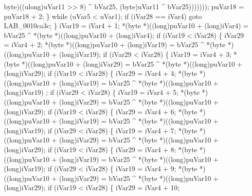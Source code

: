 \documentclass[
]{article}
\newenvironment{Shaded}{}{}
\newcommand{\NormalTok}[1]{#1}
\begin{document}
\begin{Shaded}
\begin{Highlighting}[]
\NormalTok{                                                  byte)((ulong)uVar11 \textgreater{}\textgreater{} 8) \^{} bVar25,}
\NormalTok{                                                  (byte)uVar11 \^{} bVar25)))))));}
\NormalTok{        puVar18 = puVar18 + 2;}
\NormalTok{      \} while (uVar5 \textless{} uVar1);}
\NormalTok{      if (iVar28 == iVar4) goto LAB\_0010ca3c;}
\NormalTok{    \}}
\NormalTok{    iVar19 = iVar4 + 1;}
\NormalTok{    *(byte *)((long)puVar10 + (long)iVar4) = bVar25 \^{} *(byte *)((long)puVar10 + (long)iVar4);}
\NormalTok{    if (iVar19 \textless{} iVar28) \{}
\NormalTok{      iVar29 = iVar4 + 2;}
\NormalTok{      *(byte *)((long)puVar10 + (long)iVar19) = bVar25 \^{} *(byte *)((long)puVar10 + (long)iVar19);}
\NormalTok{      if (iVar29 \textless{} iVar28) \{}
\NormalTok{        iVar19 = iVar4 + 3;}
\NormalTok{        *(byte *)((long)puVar10 + (long)iVar29) = bVar25 \^{} *(byte *)((long)puVar10 + (long)iVar29);}
\NormalTok{        if (iVar19 \textless{} iVar28) \{}
\NormalTok{          iVar29 = iVar4 + 4;}
\NormalTok{          *(byte *)((long)puVar10 + (long)iVar19) = bVar25 \^{} *(byte *)((long)puVar10 + (long)iVar19)}
\NormalTok{          ;}
\NormalTok{          if (iVar29 \textless{} iVar28) \{}
\NormalTok{            iVar19 = iVar4 + 5;}
\NormalTok{            *(byte *)((long)puVar10 + (long)iVar29) =}
\NormalTok{                 bVar25 \^{} *(byte *)((long)puVar10 + (long)iVar29);}
\NormalTok{            if (iVar19 \textless{} iVar28) \{}
\NormalTok{              iVar29 = iVar4 + 6;}
\NormalTok{              *(byte *)((long)puVar10 + (long)iVar19) =}
\NormalTok{                   bVar25 \^{} *(byte *)((long)puVar10 + (long)iVar19);}
\NormalTok{              if (iVar29 \textless{} iVar28) \{}
\NormalTok{                iVar19 = iVar4 + 7;}
\NormalTok{                *(byte *)((long)puVar10 + (long)iVar29) =}
\NormalTok{                     bVar25 \^{} *(byte *)((long)puVar10 + (long)iVar29);}
\NormalTok{                if (iVar19 \textless{} iVar28) \{}
\NormalTok{                  iVar29 = iVar4 + 8;}
\NormalTok{                  *(byte *)((long)puVar10 + (long)iVar19) =}
\NormalTok{                       bVar25 \^{} *(byte *)((long)puVar10 + (long)iVar19);}
\NormalTok{                  if (iVar29 \textless{} iVar28) \{}
\NormalTok{                    iVar19 = iVar4 + 9;}
\NormalTok{                    *(byte *)((long)puVar10 + (long)iVar29) =}
\NormalTok{                         bVar25 \^{} *(byte *)((long)puVar10 + (long)iVar29);}
\NormalTok{                    if (iVar19 \textless{} iVar28) \{}
\NormalTok{                      iVar29 = iVar4 + 10;}

\end{Highlighting}
\end{Shaded}
\end{document}
